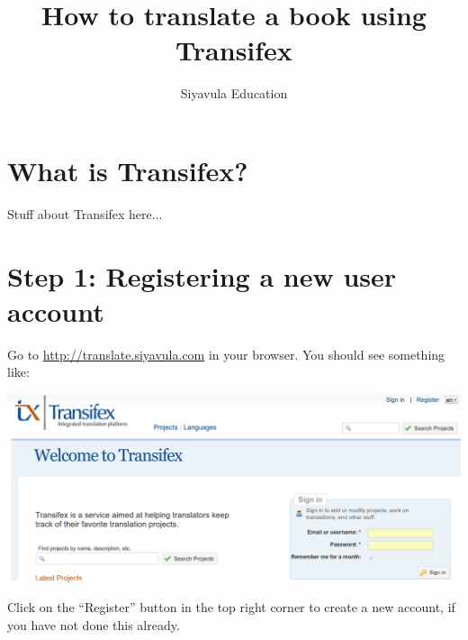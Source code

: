 \documentclass[10pt, a4paper]{article}
\title{How to translate a book using Transifex}
\author{Siyavula Education}
\date{}
\begin{document}
\maketitle

\section*{What is Transifex?}

Stuff about Transifex here...

\section*{Step 1: Registering a new user account}

Go to \url{http://translate.siyavula.com} in your browser. You should see something like:

\begin{center}
    \centerline{\includegraphics[width=\textwidth]{images/Screenshot.png}}
\end{center}
Click on the ``Register'' button in the top right corner to create a new account, if you have not done this already.
\end{document}
